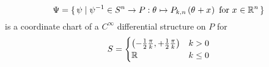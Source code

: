 \documentclass[../main.tex]{subfiles}
\begin{document}
\begin{lemma}\label{M:CoordinateChart}
    \begin{equation*}
        \Psi=\set{\psi|
            \psi^{-1}
            \in S^n \to P
            :\tensor{\theta}{}\mapsto P_{k,n}\left(\tensor{\theta}{}+\tensor{x}{}\right)
            \text{ for }
            \tensor{x}{} \in \R^n
        }
    \end{equation*} is a coordinate chart of a $C^\infty$ differential structure on $P$
    for \begin{equation*}
        S=
        \begin{cases}
            \left(-\frac{1}{2}\frac{\pi}{k},+\frac{1}{2}\frac{\pi}{k}\right) & \text{$k>0$}   \\
            \mathbb{R}                                                               & \text{$k\le0$}
        \end{cases}
    \end{equation*}
\end{lemma}
\end{document}
